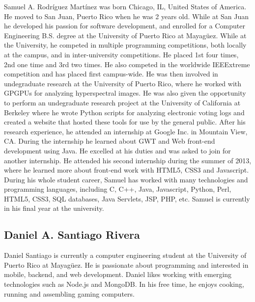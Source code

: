 Samuel A. Rodríguez Martínez was born Chicago, IL, United States of America. He
moved to San Juan, Puerto Rico when he was 2 years old. While at San Juan he
developed his passion for software development, and enrolled for a Computer
Engineering B.S. degree at the University of Puerto Rico at Mayagüez. While at
the University, he competed in multiple programming competitions, both locally
at the campus, and in inter-university competitions. He placed 1st four times,
2nd one time and 3rd two times. He also competed in the worldwide IEEExtreme
competition and has placed first campus-wide. He was then involved in
undegraduate research at the University of Puerto Rico, where he worked with
GPGPUs for analyzing hyperspectral images. He was also given the opportunity to
perform an undegraduate research project at the University of California at
Berkeley where he wrote Python scripts for analyzing electronic voting logs and
created a website that hosted these tools for use by the general public. After
his research experience, he attended an internship at Google Inc. in Mountain
View, CA. During the internship he learned about GWT and Web front-end
development using Java. He excelled at his duties and was asked to join for
another internship. He attended his second internship during the summer of 2013,
where he learned more about front-end work with HTML5, CSS3 and Javascript.
During his whole student career, Samuel has worked with many technologies and
programming languages, including C, C++, Java, Javascript, Python, Perl, HTML5,
CSS3, SQL databases, Java Servlets, JSP, PHP, etc. Samuel is currently in his
final year at the university.

\subsection*{Daniel A. Santiago Rivera}

Daniel Santiago is currently a computer engineering student at the University of
Puerto Rico at Mayagüez. He is passionate about programming and interested in
mobile, backend, and web development. Daniel likes working with emerging
technologies such as Node.js and MongoDB. In his free time, he enjoys cooking,
running and assembling gaming computers.

